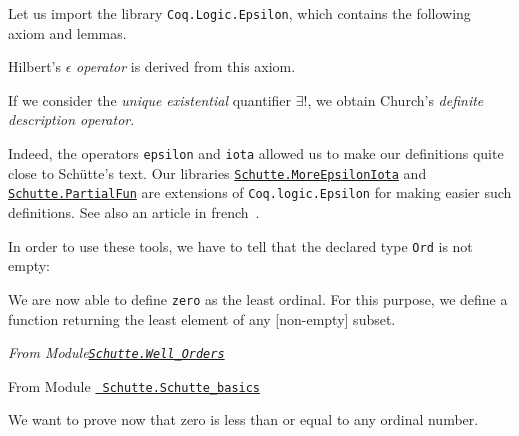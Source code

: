 Let us import the library \texttt{Coq.Logic.Epsilon}, which contains the following axiom and lemmas.




Hilbert's $\epsilon$ \emph{operator} is derived from this  axiom.




If we consider the \emph{unique existential} quantifier $\exists!$, we obtain
Church's \emph{definite description operator}.



Indeed, the operators \texttt{epsilon} and \texttt{iota} allowed us to make our definitions 
quite close to Schütte's text. Our libraries \href{../theories/html/hydras.Schutte.MoreEpsilonIota.html}%
{\texttt{Schutte.MoreEpsilonIota}}
and
\href{../theories/html/hydras.Schutte.PartialFun.html}%
{\texttt{Schutte.PartialFun}} are extensions of \texttt{Coq.logic.Epsilon} for making easier 
such definitions. See also an article in french~\cite{PCiota}. 





In order to use these tools,  we have to tell \coq{}  that the declared type \texttt{Ord} is not empty:






We are now able to define \texttt{zero} as the least ordinal. For this purpose,
we define a function returning the least element of any [non-empty]  subset.


\emph{From Module\href{../theories/html/hydras.Schutte.Well_Orders.html}%
  {\texttt{Schutte.Well\_Orders}}}






\vspace{4pt}

From Module \href{../theories/html/hydras.Schutte.Schutte_basics.html}%
{\texttt{~Schutte.Schutte\_basics}}

\label{Constants:zero:Ord}



We want to prove now that zero is less than or equal to any ordinal number.

